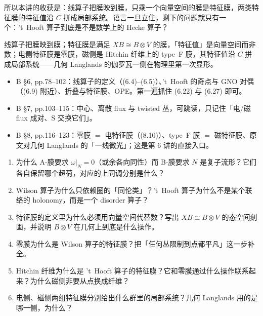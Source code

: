所以本讲的收获是：线算子把膜映到膜，只乘一个向量空间的膜是特征膜，两类特征膜的特征值沿 $C$ 拼成局部系统。语言一旦立住，剩下的问题就只有一个：'t~Hooft 算子到底是不是数学上的 Hecke 算子？

\begin{keybox}
线算子把膜映到膜；特征膜是满足 $XB\cong B\otimes V$ 的膜，「特征值」是向量空间而非数；电侧特征膜是零膜，磁侧是 Hitchin 纤维上的 type~F 膜，其特征值沿 $C$ 拼成局部系统——几何 Langlands 的伽罗瓦一侧在物理里第一次显形。
\end{keybox}

\begin{follow}
\begin{itemize}
\item B \S6, pp.78--102：线算子的定义（(6.4)--(6.5)）、't~Hooft 的奇点与 GNO 对偶（(6.9) 附近）、折叠与特征膜、OPE。第一遍抓住 (6.22) 与 (6.27) 即可。
\item B \S7, pp.103--115：中心、离散 flux 与 twisted 丛，可跳读，只记住「电/磁 flux 成对、S 交换它们」。
\item B \S8, pp.116--123：零膜 $=$ 电特征膜（(8.10)）、type~F 膜 $=$ 磁特征膜、原文对几何 Langlands 的「一线微光」；这是第 6 讲的直接入口。
\end{itemize}
\end{follow}

\begin{checkbox}
\begin{enumerate}
\item 为什么 A-膜要求 $\omega|_N=0$（或余各向同性）而 B-膜要求 $N$ 是复子流形？它们各自保留哪个超荷，对应的上同调分别是什么？
\item Wilson 算子为什么只依赖圈的「同伦类」？'t~Hooft 算子为什么不是某个联络的 holonomy，而是一个 disorder 算子？
\item 特征膜的定义里为什么必须用向量空间代替数？写出 $XB\cong B\otimes V$ 的态空间刻画，并说明 $B\otimes V$ 在几何上到底是什么操作。
\item 零膜为什么是 Wilson 算子的特征膜？把「任何丛限制到点都平凡」这一步补全。
\item Hitchin 纤维为什么是 't~Hooft 算子的特征膜？它和零膜通过什么操作联系起来？为什么磁侧非要从点换成纤维？
\item 电侧、磁侧两组特征膜分别给出什么群里的局部系统？几何 Langlands 用的是哪一侧，为什么？
\end{enumerate}
\end{checkbox}
